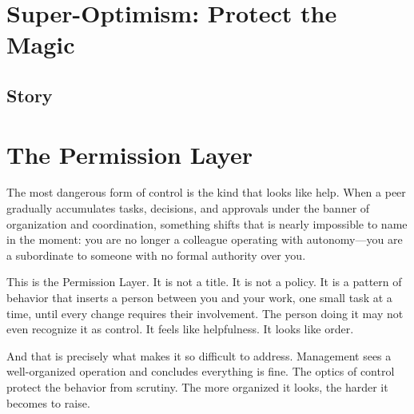 \section{Super-Optimism: Protect the Magic}



\subsection{Story}

\section{The Permission Layer}


The most dangerous form of control is the kind that looks like help.
When a peer gradually accumulates tasks, decisions, and approvals under
the banner of organization and coordination, something shifts that is
nearly impossible to name in the moment: you are no longer a colleague
operating with autonomy---you are a subordinate to someone with no
formal authority over you.

This is the Permission Layer. It is not a title. It is not a policy.
It is a pattern of behavior that inserts a person between you and your
work, one small task at a time, until every change requires their
involvement. The person doing it may not even recognize it as control.
It feels like helpfulness. It looks like order.

And that is precisely what makes it so difficult to address.
Management sees a well-organized operation and concludes everything is
fine. The optics of control protect the behavior from scrutiny.
The more organized it looks, the harder it becomes to raise.

